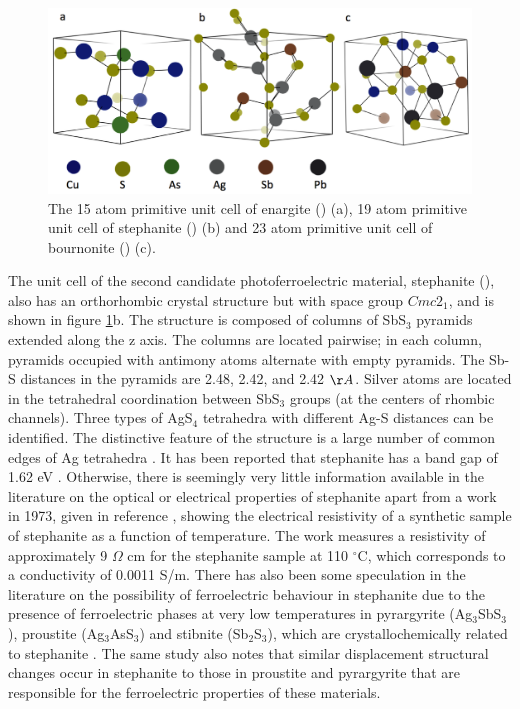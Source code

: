 \begin{figure}[h!]
  \centering
    \includegraphics[width=1.0\textwidth]{figures/unit_cells.png}
    \caption{The 15 atom primitive unit cell of enargite (\enargite) (a), 19 atom primitive unit cell of stephanite (\stephanite) (b) and 23 atom primitive unit cell of bournonite (\bournonite) (c).}
  \label{unit_cells}
\end{figure}

The unit cell of the second candidate photoferroelectric material, stephanite (\stephanite), also has an orthorhombic crystal structure but with space group $Cmc2_1$, and is shown in figure \ref{unit_cells}b. 
The structure is composed of columns of SbS$_3$ pyramids extended along the z axis. The columns are located pairwise; in each column, pyramids occupied with antimony atoms alternate with empty pyramids. The Sb-S distances in the pyramids are 2.48, 2.42, and 2.42 $\AA$. Silver atoms are located in the tetrahedral coordination between SbS$_3$ groups (at the centers of rhombic channels). Three types of AgS$_4$ tetrahedra with different Ag-S distances can be identified. The distinctive feature of the structure is a large number of common edges of Ag tetrahedra \cite{stephanite}.
It has been reported that stephanite has a band gap of 1.62 eV \cite{Dittrich1}. Otherwise, there is seemingly very little information available in the literature on the optical or electrical properties of stephanite apart from a work in 1973, given in reference , showing the electrical resistivity of a synthetic sample of stephanite as a function of temperature. The work measures a resistivity of approximately 9 $\Omega$ cm for the stephanite sample at 110 $^\circ$C, which corresponds to a conductivity of 0.0011 S/m. There has also been some speculation in the literature on the possibility of ferroelectric behaviour in stephanite due to the presence of ferroelectric phases at very low temperatures in pyrargyrite (Ag$_3$SbS$_3$), proustite (Ag$_3$AsS$_3$) and stibnite (Sb$_2$S$_3$), which are crystallochemically related to stephanite \cite{stephanite}. The same study also notes that similar displacement structural changes occur in stephanite to those in proustite and pyrargyrite that are responsible for the ferroelectric properties of these materials.

